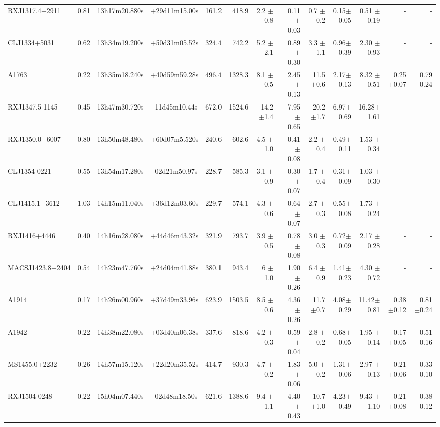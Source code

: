 \documentclass{aa}
\begin{document}
\begin{landscape}
\begin{longtable}{lcccrrrrrrrrr}
RXJ1317.4+2911  &0.81 & 13h17m20.880s &+29d11m15.00s  &  161.2   &  418.9   &  2.2  $\pm$0.8 & 0.11 $\pm$ 0.03&0.7  $\pm$0.2  & 0.15$\pm$0.05& 0.51 $\pm$0.19& - & -   \\
CLJ1334+5031	 &0.62 & 13h34m19.200s &+50d31m05.52s  &  324.4   &  742.2   &  5.2  $\pm$2.1 & 0.89 $\pm$ 0.30&3.3  $\pm$1.1  & 0.96$\pm$0.39& 2.30 $\pm$0.93& - & -   \\
A1763 	 	 &0.22 & 13h35m18.240s &+40d59m59.28s  &  496.4   &  1328.3  &  8.1  $\pm$0.5 & 2.45 $\pm$ 0.13&11.5 $\pm$0.6  & 2.17$\pm$0.13& 8.32 $\pm$0.51& 0.25 $\pm$0.07 & 0.79 $\pm$0.24  \\
RXJ1347.5-1145  &0.45 & 13h47m30.720s &--11d45m10.44s  &  672.0   &  1524.6  &  14.2 $\pm$1.4 & 7.95 $\pm$ 0.65&20.2 $\pm$1.7  & 6.97$\pm$0.69& 16.28$\pm$1.61& - & -   \\
RXJ1350.0+6007  &0.80 & 13h50m48.480s &+60d07m5.520s  &  240.6   &  602.6   &  4.5  $\pm$1.0 & 0.41 $\pm$ 0.08&2.2  $\pm$0.4  & 0.49$\pm$0.11& 1.53 $\pm$0.34& - & -   \\
CLJ1354-0221	 &0.55 & 13h54m17.280s &--02d21m50.97s  &  228.7   &  585.3   &  3.1  $\pm$0.9 & 0.30 $\pm$ 0.07&1.7  $\pm$0.4  & 0.31$\pm$0.09& 1.03 $\pm$0.30& - & -   \\
CLJ1415.1+3612  &1.03 & 14h15m11.040s &+36d12m03.60s  &  229.7   &  574.1   &  4.3  $\pm$0.6 & 0.64 $\pm$ 0.07&2.7  $\pm$0.3  & 0.55$\pm$0.08& 1.73 $\pm$0.24& - & -   \\
RXJ1416+4446	 &0.40 & 14h16m28.080s &+44d46m43.32s  &  321.9   &  793.7   &  3.9  $\pm$0.5 & 0.78 $\pm$ 0.08&3.0  $\pm$0.3  & 0.72$\pm$0.09& 2.17 $\pm$0.28& - & -   \\
MACSJ1423.8+2404&0.54 & 14h23m47.760s &+24d04m41.88s  &  380.1   &  943.4   &  6    $\pm$1.0 & 1.90 $\pm$ 0.26&6.4  $\pm$0.9  & 1.41$\pm$0.23& 4.30 $\pm$0.72& - & -   \\
A1914  	 &0.17 & 14h26m00.960s &+37d49m33.96s  &  623.9   &  1503.5  &  8.5  $\pm$0.6 & 4.36 $\pm$ 0.26&11.7 $\pm$0.7  & 4.08$\pm$0.29& 11.42$\pm$0.81& 0.38 $\pm$0.12 & 0.81 $\pm$0.24 \\
A1942  	 &0.22 & 14h38m22.080s &+03d40m06.38s  &  337.6   &  818.6   &  4.2  $\pm$0.3 & 0.59 $\pm$ 0.04&2.8  $\pm$0.2  & 0.68$\pm$0.05& 1.95 $\pm$0.14& 0.17 $\pm$0.05 & 0.51 $\pm$0.16  \\
MS1455.0+2232   &0.26 & 14h57m15.120s &+22d20m35.52s  &  414.7   &  930.3   &  4.7  $\pm$0.2 & 1.83 $\pm$ 0.06&5.0  $\pm$0.2  & 1.31$\pm$0.06& 2.97 $\pm$0.13& 0.21 $\pm$0.06 & 0.33 $\pm$0.10  \\
RXJ1504-0248	 &0.22 & 15h04m07.440s &--02d48m18.50s  &  621.6   &  1388.6  &  9.4  $\pm$1.1 & 4.40 $\pm$ 0.43&10.7 $\pm$1.0  & 4.23$\pm$0.49& 9.43 $\pm$1.10& 0.21 $\pm$0.08 & 0.38 $\pm$0.12  \\

\end{longtable}
\end{landscape}
\end{document}
